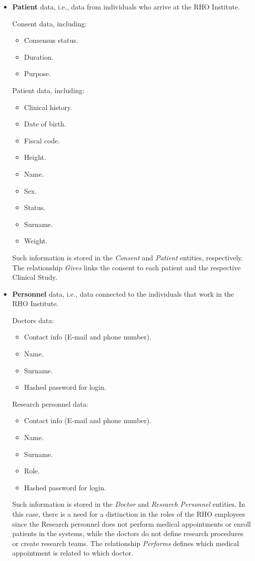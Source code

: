 \begin{itemize}
    \item \textbf{Patient} data, i.e., data from individuals who arrive at the RHO Institute. 

    Consent data, including:
    \begin{itemize}
        \item Consensus status.
        \item Duration.
        \item Purpose.
    \end{itemize}
    Patient data, including:
    \begin{itemize}
        \item Clinical history.
        \item Date of birth.
        \item Fiscal code.
        \item Height.
        \item Name.
        \item Sex.
        \item Status.
        \item Surname.
        \item Weight.
    \end{itemize}
    Such information is stored in the \emph{Consent} and \emph{Patient} entities, respectively. The relationship \emph{Gives} links the consent to each patient and the respective Clinical Study.
    
    \item \textbf{Personnel} data, i.e., data connected to the individuals that work in the RHO Institute.

    Doctors data:
    \begin{itemize}
        \item Contact info (E-mail and phone number).
        \item Name.
        \item Surname.
        \item Hashed password for login.
    \end{itemize}
    Research personnel data:
    \begin{itemize}
        \item Contact info (E-mail and phone number).
        \item Name.
        \item Surname.
        \item Role.
        \item Hashed password for login.
    \end{itemize}
    Such information is stored in the \emph{Doctor} and \emph{Research Personnel} entities. In this case, there is a need for a distinction in the roles of the RHO employees since the Research personnel does not perform medical appointments or enroll patients in the systems, while the doctors do not define research procedures or create research teams. The relationship \emph{Performs} defines which medical appointment is related to which doctor.


\end{itemize}
